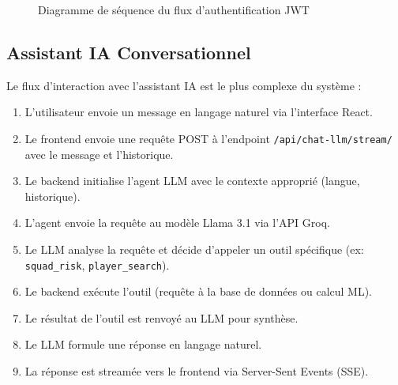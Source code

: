\begin{figure}[H]
\centering
{}
\caption{Diagramme de séquence du flux d'authentification JWT}
\label{fig:auth-seq}
\end{figure}

\subsection{Assistant IA Conversationnel}

Le flux d'interaction avec l'assistant IA est le plus complexe du système :

\begin{enumerate}
    \item L'utilisateur envoie un message en langage naturel via l'interface React.
    \item Le frontend envoie une requête POST à l'endpoint \texttt{/api/chat-llm/stream/} avec le message et l'historique.
    \item Le backend initialise l'agent LLM avec le contexte approprié (langue, historique).
    \item L'agent envoie la requête au modèle Llama 3.1 via l'API Groq.
    \item Le LLM analyse la requête et décide d'appeler un outil spécifique (ex: \texttt{squad\_risk}, \texttt{player\_search}).
    \item Le backend exécute l'outil (requête à la base de données ou calcul ML).
    \item Le résultat de l'outil est renvoyé au LLM pour synthèse.
    \item Le LLM formule une réponse en langage naturel.
    \item La réponse est streamée vers le frontend via Server-Sent Events (SSE).
\end{enumerate}

